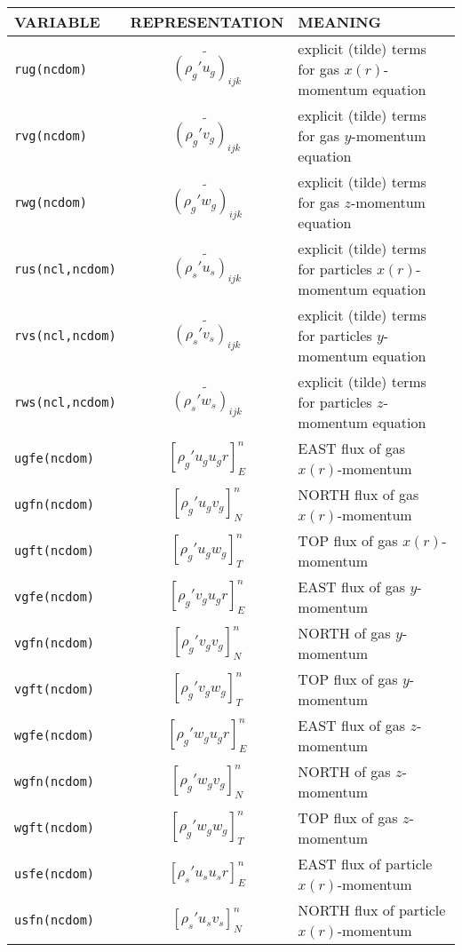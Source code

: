 \begin{tabular}{|p{4cm}|c|p{8cm}|}\hline
VARIABLE & REPRESENTATION & MEANING\\\hline
\tt rug(ncdom)& $\widetilde{(\rho_g'u_g)_{ijk}}$ &explicit (tilde) terms for gas $x(r)$-mo\-men\-tum equation\\\hline
\tt rvg(ncdom)& $\widetilde{(\rho_g'v_g)_{ijk}}$ &explicit (tilde) terms for gas $y$-mo\-men\-tum equation\\\hline
\tt rwg(ncdom)& $\widetilde{(\rho_g'w_g)_{ijk}}$ &explicit (tilde) terms for gas $z$-mo\-men\-tum equation\\\hline
\tt rus(ncl,ncdom)& $\widetilde{(\rho_s'u_s)_{ijk}}$ &explicit (tilde) terms for particles $x(r)$-mo\-men\-tum equation\\\hline
\tt rvs(ncl,ncdom)& $\widetilde{(\rho_s'v_s)_{ijk}}$ &explicit (tilde) terms for particles $y$-mo\-men\-tum equation\\\hline
\tt rws(ncl,ncdom)& $\widetilde{(\rho_s'w_s)_{ijk}}$ &explicit (tilde) terms for particles $z$-mo\-men\-tum equation\\\hline
\tt ugfe(ncdom) & $\left[ \rho_g' u_g u_g r \right]_{E}^n$ & EAST flux of gas $x(r)$-momentum \\\hline 
\tt ugfn(ncdom) & $\left[ \rho_g' u_g v_g \right]_{N}^n$ & NORTH flux of gas $x(r)$-momentum \\\hline
\tt ugft(ncdom) & $\left[ \rho_g' u_g w_g \right]_{T}^n$ & TOP flux of gas $x(r)$-momentum \\\hline
\tt vgfe(ncdom) & $\left[ \rho_g' v_g u_g r \right]_{E}^n$ & EAST flux of gas $y$-momentum \\\hline
\tt vgfn(ncdom) & $\left[ \rho_g' v_g v_g \right]_{N}^n$ & NORTH of gas $y$-momentum \\\hline
\tt vgft(ncdom) & $\left[ \rho_g' v_g w_g \right]_{T}^n$ & TOP flux of gas $y$-momentum \\\hline
\tt wgfe(ncdom) & $\left[ \rho_g' w_g u_g r \right]_{E}^n$ & EAST flux of gas $z$-momentum \\\hline
\tt wgfn(ncdom) & $\left[ \rho_g' w_g v_g \right]_{N}^n$ & NORTH of gas $z$-momentum \\\hline
\tt wgft(ncdom) & $\left[ \rho_g' w_g w_g \right]_{T}^n$ & TOP flux of gas $z$-momentum \\\hline
\tt usfe(ncdom) & $\left[ \rho_s' u_s u_s r \right]_{E}^n$ & EAST flux of particle $x(r)$-momentum \\\hline 
\tt usfn(ncdom) & $\left[ \rho_s' u_s v_s \right]_{N}^n$ & NORTH flux of particle $x(r)$-momentum \\\hline

\end{tabular}
